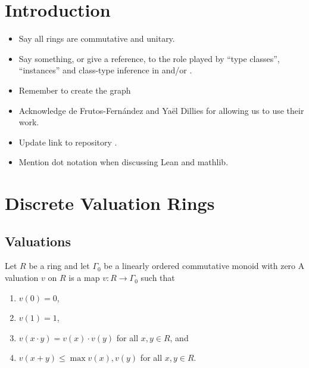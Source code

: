 \documentclass[sigplan,10pt,anonymous,review]{acmart}
\begin{document}
\section{Introduction}
\begin{itemize}
\item Say all rings are commutative and unitary.
\item Say something, or give a reference, to the role played by ``type classes'', ``instances'' and class-type inference in \lean and/or \mathlib.
\item Remember to create the graph
\item Acknowledge de Frutos-Fernández and Yaël Dillies for allowing us to use their work.
\item Update link to repository \href{https://github.com/mariainesdff/local_class_field_theory}{\extlink}.
\item Mention dot notation when discussing Lean and mathlib.

\end{itemize}
\section {Discrete Valuation Rings}\label{section:dvr}

\subsection{Valuations}\label{subsection:valuations}
Let $R$ be a ring and let $\Gamma_0$ be a linearly ordered commutative monoid with zero A valuation $v$ on $R$ is a map $v \colon R \to \Gamma_0$ such that
\begin{enumerate}
	\item $v (0) = 0$,
	\item $v (1) = 1$,
	\item $v (x \cdot y) = v (x) \cdot v (y)$ for all $x, y \in R$, and
	\item $v (x + y) \le \max {v (x), v (y)}$ for all $x, y \in R$.
\end{enumerate}
\end{document}
